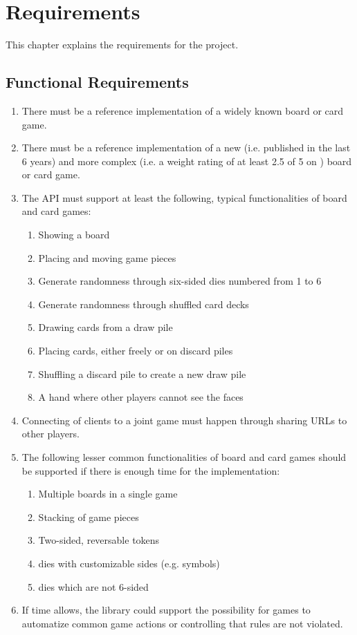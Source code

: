 \chapter{Requirements} \label{chap:requirements}

This chapter explains the requirements for the project.

\section{Functional Requirements}

\begin{enumerate}
  \item There must be a reference implementation of a widely known board or card
  game.
  \item There must be a reference implementation of a new (i.e. published in
  the last 6 years) and more complex (i.e. a weight rating of at least 2.5 of 5
  on \cite{BGG}) board or card game.
  \item The API must support at least the following, typical functionalities of
  board and card games:
  \begin{enumerate}
    \item Showing a board
    \item Placing and moving game pieces
    \item Generate randomness through six-sided \glspl{die} numbered from 1 to 6
    \item Generate randomness through shuffled card \glspl{deck}
    \item Drawing cards from a \gls{draw pile}
    \item Placing cards, either freely or on \glspl{discard pile}
    \item Shuffling a \gls{discard pile} to create a new \gls{draw pile}
    \item A \gls{hand} where other players cannot see the \glspl{face}
  \end{enumerate}
  \item Connecting of clients to a joint game must happen through sharing URLs
  to other players.
  \item The following lesser common functionalities of board and card games
  should be supported if there is enough time for the implementation:
  \begin{enumerate}
    \item Multiple boards in a single game
    \item Stacking of game pieces
    \item Two-sided, reversable tokens
    \item \Glspl{die} with customizable sides (e.g. symbols)
    \item \Glspl{die} which are not 6-sided
  \end{enumerate}
  \item If time allows, the library could support the possibility for games to
  automatize common game actions or controlling that rules are not violated.
\end{enumerate}

